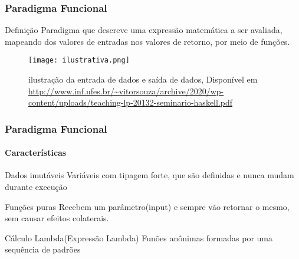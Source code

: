 \documentclass[aspectratio=169]{beamer}
\begin{document}
    \begin{frame}
      \frametitle{Paradigma Funcional}

      \begin{block}{Definição}
        Paradigma que descreve uma expressão matemática a ser avaliada,
        mapeando dos valores de entradas nos valores de retorno, por meio de funções.
      \end{block} \pause 

    \begin{figure}
      \texttt{[image: ilustrativa.png]}
      \caption{\centering ilustração da entrada de dados e saída de dados, Disponível em \url{http://www.inf.ufes.br/~vitorsouza/archive/2020/wp-content/uploads/teaching-lp-20132-seminario-haskell.pdf}}
    \end{figure}
       
    \end{frame}

    \begin{frame}
      \frametitle{Paradigma Funcional}
      \framesubtitle{Características}

      \begin{block}{Dados imutáveis}
        Variáveis com tipagem forte, que são definidas e nunca mudam durante
        execução
      \end{block} \pause 

      \begin{block}{Funções puras}
        Recebem um parâmetro(input) e sempre vão retornar o mesmo, sem causar efeitos colaterais.
      \end{block} \pause 

      \begin{block}{Cálculo Lambda(Expressão Lambda)}
        Funões anônimas formadas por uma sequência de padrões
      \end{block} 
       
    \end{frame}
\end{document}

